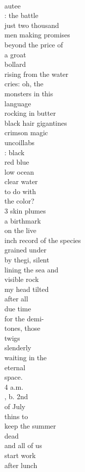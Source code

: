 \documentclass[smalldemyvopaper,11pt,twoside,onecolumn,openright,extrafontsizes]{memoir}
\begin{document}
\\autee
\\: the battle
\\just two thousand
\\men making promises
\\beyond the price of
\\a groat
\\bollard
\\rising from the water
\\cries: oh, the
\\monsters in this
\\language
\\rocking in butter
\\black hair gigantines
\\crimson magic
\\uncoillabs
\\: black
\\red blue
\\low ocean
\\clear water
\\to do with
\\the color?
\\3 skin plumes
\\a birthmark
\\on the live
\\inch record of the species
\\grained under
\\by thegi, silent
\\lining the sea and
\\visible rock
\\my head tilted
\\after all
\\due time
\\for the demi-
\\tones, those
\\twigs
\\slenderly
\\waiting in the
\\eternal
\\space.
\\4 a.m.
\\, b. 2nd
\\of July
\\thins to
\\keep the summer
\\dead
\\and all of us
\\start work
\\after lunch
\end{document}
